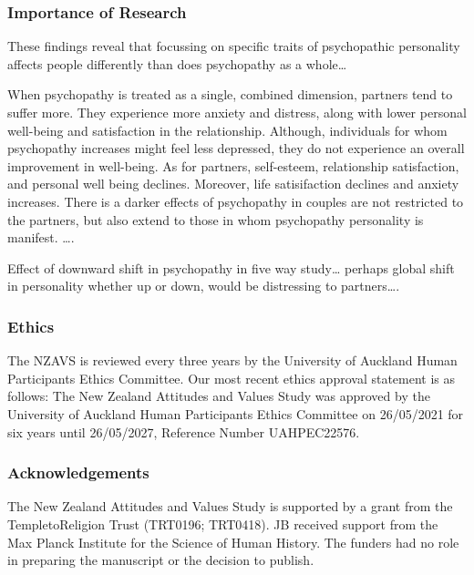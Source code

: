 \documentclass[
  single column]{article}
\begin{document}
\newpage{}

\subsubsection{Importance of Research}\label{importance-of-research}

These findings reveal that focussing on specific traits of psychopathic
personality affects people differently than does psychopathy as a
whole\ldots{}

When psychopathy is treated as a single, combined dimension, partners
tend to suffer more. They experience more anxiety and distress, along
with lower personal well-being and satisfaction in the relationship.
Although, individuals for whom psychopathy increases might feel less
depressed, they do not experience an overall improvement in well-being.
As for partners, self-esteem, relationship satisfaction, and personal
well being declines. Moreover, life satisifaction declines and anxiety
increases. There is a darker effects of psychopathy in couples are not
restricted to the partners, but also extend to those in whom psychopathy
personality is manifest. \ldots.

Effect of downward shift in psychopathy in five way study\ldots{}
perhaps global shift in personality whether up or down, would be
distressing to partners\ldots.

\newpage{}

\subsubsection{Ethics}\label{ethics}

The NZAVS is reviewed every three years by the University of Auckland
Human Participants Ethics Committee. Our most recent ethics approval
statement is as follows: The New Zealand Attitudes and Values Study was
approved by the University of Auckland Human Participants Ethics
Committee on 26/05/2021 for six years until 26/05/2027, Reference Number
UAHPEC22576.

\subsubsection{Acknowledgements}\label{acknowledgements}

The New Zealand Attitudes and Values Study is supported by a grant from
the TempletoReligion Trust (TRT0196; TRT0418). JB received support from
the Max Planck Institute for the Science of Human History. The funders
had no role in preparing the manuscript or the decision to publish.
\end{document}
